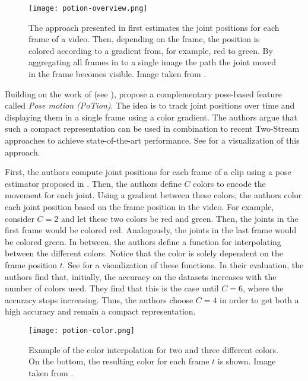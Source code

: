 \begin{figure}[htb!]
    \centering
    \texttt{[image: potion-overview.png]}
    \caption{The approach presented in \cite{choutas_potion:_2018} first estimates the joint positions for each frame of a video. Then, depending on the frame, the position is colored according to a gradient from, for example, red to green. By aggregating all frames in to a single image the path the joint moved in the frame becomes visible. Image taken from \cite{choutas_potion:_2018}. }
    \label{fig:potion-overview}
\end{figure}

Building on the work of \cite{simonyan_two-stream_2014} (see ), \cite{choutas_potion:_2018} propose a complementary pose-based feature called \textit{Pose motion (PoTion)}.
The idea is to track joint positions over time and displaying them in a single frame using a color gradient.
The authors argue that such a compact representation can be used in combination to recent Two-Stream approaches to achieve state-of-the-art performance.
See  for a visualization of this approach.

First, the authors compute joint positions for each frame of a clip using a pose estimator proposed in \cite{cao_realtime_2017}.
Then, the authors define $C$ colors to encode the movement for each joint.
Using a gradient between these colors, the authors color each joint position based on the frame position in the video.
For example, consider $C=2$ and let these two colors be red and green.
Then, the joints in the first frame would be colored red.
Analogously, the joints in the last frame would be colored green.
In between, the authors define a function for interpolating between the different colors.
Notice that the color is solely dependent on the frame position $t$.
See  for a visualization of these functions. 
In their evaluation, the authors find that, initially, the accuracy on the datasets increases with the number of colors used.
They find that this is the case until $C=6$, where the accuracy stops increasing.
Thus, the authors choose $C=4$ in order to get both a high accuracy and remain a compact representation.

\begin{figure}[htb!]
    \centering
    \texttt{[image: potion-color.png]}
    \caption{Example of the color interpolation for two and three different colors. On the bottom, the resulting color for each frame $t$ is shown. Image taken from \cite{choutas_potion:_2018}. }
    \label{fig:potion-color}
\end{figure}

